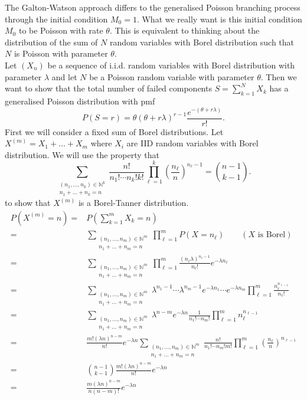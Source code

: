 \documentclass{article}
\renewcommand{\l}{\ell}
\begin{document}
The Galton-Watson approach differs to the generalised Poisson branching process through the initial condition $M_0=1$. What we really want is this initial condition $M_0$ to be Poisson with rate $\theta$. This is equivalent to thinking about the distribution of the sum of $N$ random variables with Borel distribution such that $N$ is Poisson with parameter $\theta$. \\

Let $(X_n)$ be a sequence of i.i.d. random variables with Borel distribution with parameter $\lambda$ and let $N$ be a Poisson random variable with parameter $\theta$. Then we want to show that the total number of failed components $S=\sum_{k=1}^{N}X_k$ has a generalised Poisson distribution with pmf
\[P(S=r) = \theta(\theta + r\lambda)^{r-1} \frac{e^{-(\theta+r\lambda)}}{r!}.\]
First we will consider a fixed sum of Borel distributions. Let $X^{(m)}= X_1+\dots+X_m$ where $X_i$ are IID random variables with Borel distribution. We will use the property that 
\[\sum_{\substack{(n_1,\dots,n_k)\in \mathbb{N}^k\\ n_1+\dots+n_k=n}} \frac{n!}{n_1!\cdots n_k! k!} \prod_{\l=1}^{k} \left(\frac{n_\l}{n}\right)^{n_\l-1} = {n-1\choose k-1}.\]
to show that $X^{(m)}$ is a Borel-Tanner distribution.
\[\begin{aligned}
P(X^{(m)}=n) =&  P \left( \sum_{k=1}^{m} X_k=n \right)\\
=& \sum_{\substack{(n_1,\dots,n_m)\in \mathbb{N}^m\\ n_1+\dots+n_m=n}} \prod_{\l=1}^{m} P(X=n_\l) \qquad (X \text{ is Borel})\\
=& \sum_{\substack{(n_1,\dots,n_m)\in \mathbb{N}^m\\ n_1+\dots+n_m=n}} \prod_{\l=1}^{m} \frac{(n_\l\lambda)^{n_\l-1}}{n_\l!}e^{-\lambda n_\l} \\
=& \sum_{\substack{(n_1,\dots,n_m)\in \mathbb{N}^m\\ n_1+\dots+n_m=n}} \lambda^{n_1-1}\cdots\lambda^{n_m-1}e^{-\lambda n_1}\cdots e^{-\lambda n_m} \prod_{\l=1}^{m} \frac{n_\l^{n_{\l-1}}}{n_\l!}\\
=& \sum_{\substack{(n_1,\dots,n_m)\in \mathbb{N}^m\\ n_1+\dots+n_m=n}} \lambda^{n-m} e^{-\lambda n} \frac{1}{n_1!\cdots n_m!} \prod_{\l=1}^{m} n_\l^{n_{\l-1}}\\
=& \frac{m! (\lambda n)^{n-m}}{n!}e^{-\lambda n} \sum_{\substack{(n_1,\dots,n_m)\in \mathbb{N}^m\\ n_1+\dots+n_m=n}} \frac{n!}{n_1!\cdots n_m!m!}  \prod_{\l=1}^{m} \left(\frac{n_\l}{n}\right)^{n_{\l-1}}\\
=&{n-1\choose k-1} \frac{m! (\lambda n)^{n-m}}{n!} e^{-\lambda n}\\
=& \frac{m(\lambda n)^{n-m}}{n(n-m)!}e^{-\lambda n}
\end{aligned} \]
\end{document}
